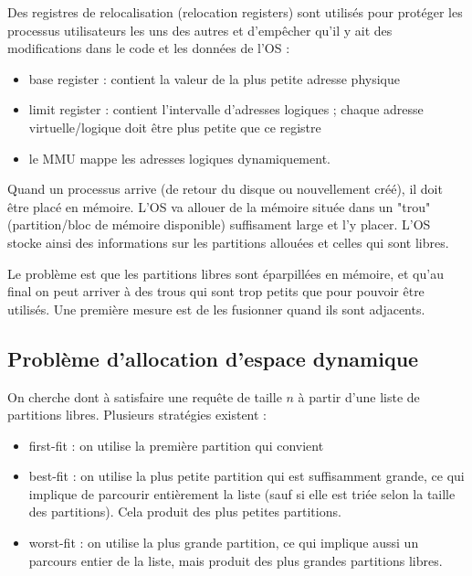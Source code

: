 Des registres de relocalisation (relocation registers) sont utilisés pour protéger les processus utilisateurs les uns des autres et d'empêcher qu'il y ait des modifications dans le code et les données de l'OS :

\begin{itemize}
	\item base register : contient la valeur de la plus petite adresse physique
	\item limit register : contient l'intervalle d'adresses logiques ; chaque adresse virtuelle/logique doit être plus petite que ce registre
	\item le MMU mappe les adresses logiques dynamiquement.
\end{itemize}


Quand un processus arrive (de retour du disque ou nouvellement créé), il doit être placé en mémoire. L'OS va allouer de la mémoire située dans un "trou" (partition/bloc de mémoire disponible) suffisament large et l'y placer. L'OS stocke ainsi des informations sur les partitions allouées et celles qui sont libres.

Le problème est que les partitions libres sont éparpillées en mémoire, et qu'au final on peut arriver à des trous qui sont trop petits que pour pouvoir être utilisés. Une première mesure est de les fusionner quand ils sont adjacents.


	\subsection{Problème d'allocation d'espace dynamique}
	
	On cherche dont à satisfaire une requête de taille $n$ à partir d'une liste de partitions libres. Plusieurs stratégies existent :
	
	\begin{itemize}
		\item first-fit : on utilise la première partition qui convient
		\item best-fit : on utilise la plus petite partition qui est suffisamment grande, ce qui implique de parcourir entièrement la liste (sauf si elle est triée selon la taille des partitions). Cela produit des plus petites partitions.
		
		\item worst-fit : on utilise la plus grande partition, ce qui implique aussi un parcours entier de la liste, mais produit des plus grandes partitions libres.
	\end{itemize}
	
